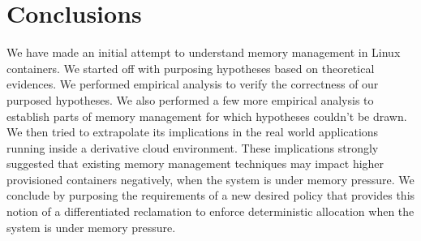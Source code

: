 
\chapter{Conclusions}
  
    We have made an initial attempt to understand memory management in Linux containers. We started off with purposing hypotheses based on 
theoretical evidences. We performed empirical analysis to verify the correctness of our purposed hypotheses. We also performed a few more 
empirical analysis to establish parts of memory management for which hypotheses couldn't be drawn. We then tried to extrapolate its 
implications in the real world applications running inside a derivative cloud environment. These implications strongly suggested that 
existing memory management techniques may impact higher provisioned containers negatively, when the system is under memory pressure. We 
conclude by purposing the requirements of a new desired policy that provides this notion of a differentiated reclamation to enforce 
deterministic allocation when the system is under memory pressure.  
  
 